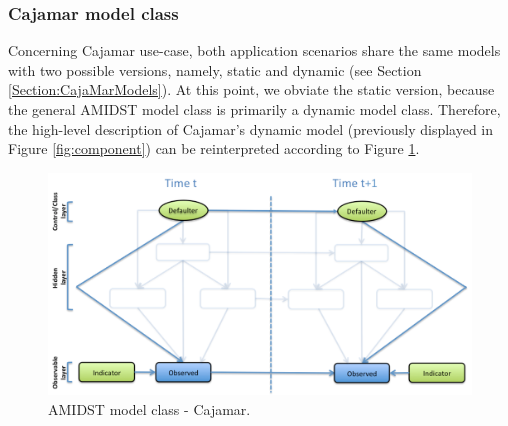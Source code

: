 \subsubsection{Cajamar model class}\label{cajamarAMIDSTModels}

Concerning Cajamar use-case, both application scenarios share the same models with two possible versions, namely, static and dynamic (see Section \ref{Section:CajaMarModels}). At this point, we obviate the static version, because the general AMIDST model class is primarily a dynamic model class. Therefore, the high-level description of Cajamar's dynamic model (previously displayed in Figure \ref{fig:component}) can be reinterpreted according  to Figure \ref{Figure:AMIDSTModelClassCajamar}. 

\begin{figure}[ht!]
\begin{center}
\includegraphics[scale=0.39]{./figures/AMIDSTModelClassCajamar.png}
\caption{\label{Figure:AMIDSTModelClassCajamar} AMIDST model class - Cajamar.}
\end{center}
\end{figure}


